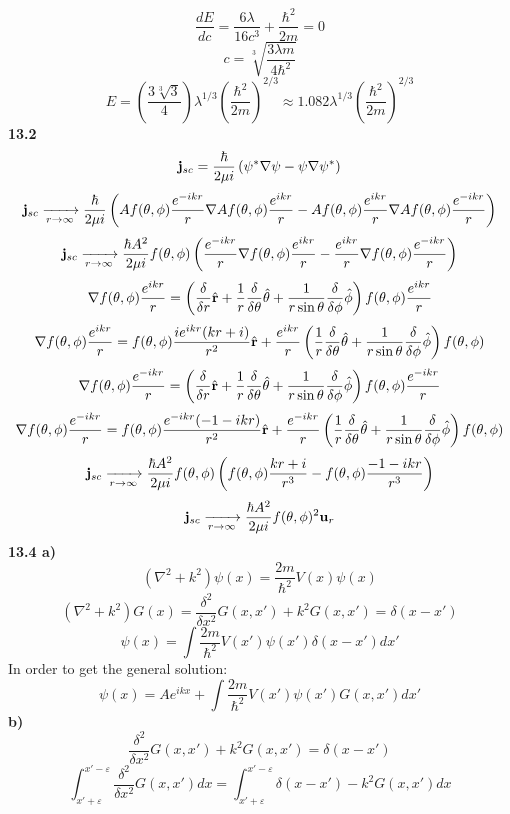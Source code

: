 \documentclass[english]{article}
\begin{document}
$$\frac{dE}{dc}=\frac{6\lambda}{16c^3}+\frac{\hbar^2}{2m}=0$$
$$c=\sqrt[3]{\frac{3\lambda m}{4\hbar^2}}$$
$$E=\left(\frac{3\sqrt[3]{3}}{4}\right)\lambda^{1/3}\left(\frac{\hbar^2}{2m}\right)^{2/3}\approx1.082\lambda^{1/3}\left(\frac{\hbar^2}{2m}\right)^{2/3}$$
\textbf{13.2}
$$\vb{j}_{sc}=\frac{\hbar}{2\mu i}\left(\psi^*\nabla\psi-\psi\nabla\psi^*\right)$$
$$\vb{j}_{sc}\xrightarrow[r\rightarrow\infty]{}\frac{\hbar}{2\mu i}\left(Af(\theta,\phi)\frac{e^{-ikr}}{r}\nabla Af(\theta,\phi)\frac{e^{ikr}}{r}-Af(\theta,\phi)\frac{e^{ikr}}{r}\nabla Af(\theta,\phi)\frac{e^{-ikr}}{r}\right)$$
$$\vb{j}_{sc}\xrightarrow[r\rightarrow\infty]{}\frac{\hbar A^2}{2\mu i}f(\theta,\phi)\left(\frac{e^{-ikr}}{r}\nabla f(\theta,\phi)\frac{e^{ikr}}{r}-
\frac{e^{ikr}}{r}\nabla f(\theta,\phi)\frac{e^{-ikr}}{r}\right)$$
$$\nabla f(\theta,\phi)\frac{e^{ikr}}{r}=\left(\frac{\delta}{\delta r}\hat{\vb{r}}+\frac{1}{r}\frac{\delta}{\delta\theta}\hat{\vb{\theta}}+\frac{1}{r\sin\theta}\frac{\delta}{\delta\phi}\hat{\vb{\phi}}\right)f(\theta,\phi)\frac{e^{ikr}}{r}$$
$$\nabla f(\theta,\phi)\frac{e^{ikr}}{r}=f(\theta,\phi)\frac{ie^{ikr}(kr+i)}{r^2}\hat{\vb{r}}+\frac{e^{ikr}}{r}\left(\frac{1}{r}\frac{\delta}{\delta\theta}\hat{\vb{\theta}}+\frac{1}{r\sin\theta}\frac{\delta}{\delta\phi}\hat{\vb{\phi}}\right)f(\theta,\phi)$$
$$\nabla f(\theta,\phi)\frac{e^{-ikr}}{r}=\left(\frac{\delta}{\delta r}\hat{\vb{r}}+\frac{1}{r}\frac{\delta}{\delta\theta}\hat{\vb{\theta}}+\frac{1}{r\sin\theta}\frac{\delta}{\delta\phi}\hat{\vb{\phi}}\right)f(\theta,\phi)\frac{e^{-ikr}}{r}$$
$$\nabla f(\theta,\phi)\frac{e^{-ikr}}{r}=f(\theta,\phi)\frac{e^{-ikr}(-1-ikr)}{r^2}\hat{\vb{r}}+\frac{e^{-ikr}}{r}\left(\frac{1}{r}\frac{\delta}{\delta\theta}\hat{\vb{\theta}}+\frac{1}{r\sin\theta}\frac{\delta}{\delta\phi}\hat{\vb{\phi}}\right)f(\theta,\phi)$$
$$\vb{j}_{sc}\xrightarrow[r\rightarrow\infty]{}\frac{\hbar A^2}{2\mu i}f(\theta,\phi)\left(f(\theta,\phi)\frac{kr+i}{r^3}-f(\theta,\phi)\frac{-1-ikr}{r^3}\right)$$
$$\vb{j}_{sc}\xrightarrow[r\rightarrow\infty]{}\frac{\hbar A^2}{2\mu i}f(\theta,\phi)^2\vb{u}_r$$
\textbf{13.4 a)}
$$\left(\nabla^2+k^2\right)\psi(x)=\frac{2m}{\hbar^2}V(x)\psi(x)$$
$$\left(\nabla^2+k^2\right)G(x)=\frac{\delta^2}{\delta x^2}G(x,x')+k^2G(x,x')=\delta(x-x')$$
$$\psi(x)=\int \frac{2m}{\hbar^2}V(x')\psi(x')\delta(x-x')dx'$$
In order to get the general solution:
$$\psi(x)=Ae^{ikx}+\int \frac{2m}{\hbar^2}V(x')\psi(x')G(x,x')dx'$$
\textbf{b)}
$$\frac{\delta^2}{\delta x^2}G(x,x')+k^2G(x,x')=\delta(x-x')$$
$$\int_{x'+\varepsilon}^{x'-\varepsilon}\frac{\delta^2}{\delta x^2}G(x,x')dx=\int_{x'+\varepsilon}^{x'-\varepsilon}\delta(x-x')-k^2G(x,x')dx$$
\end{document}
